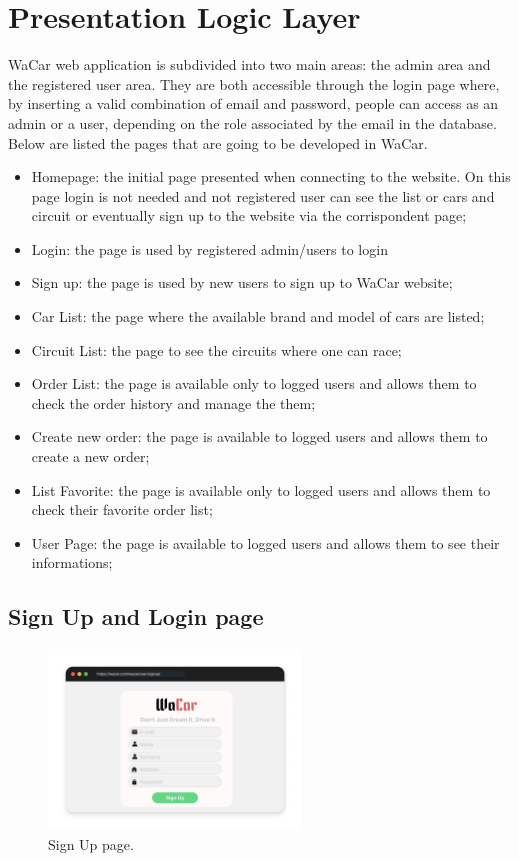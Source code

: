 \section{Presentation Logic Layer}


WaCar web application is subdivided into two main areas: the admin area and the registered user area. They are both accessible through the login page where, by inserting a valid combination of email and password, people can access as an admin or a user, depending on the role associated by the email in the database. Below are listed the pages that are going to be developed in WaCar.
\begin{itemize}
    \item Homepage: the initial page presented when connecting to the website. On this page login is not needed and not registered user can see the list or cars and circuit or eventually sign up to the website via the corrispondent page;
    \item Login: the page is used by registered admin/users to login
    \item Sign up: the page is used by new users to sign up to WaCar website;
    \item Car List: the page where the available brand and model of cars are listed;
    \item Circuit List: the page to see the circuits where one can race;
    \item Order List: the page is available only to logged users and allows them to check the order history and manage the them;
    \item Create new order: the page is available to logged users and allows them to create a new order;
    \item List Favorite: the page is available only to logged users and allows them to check their favorite order list;
    \item User Page: the page is available to logged users and allows them to see their informations;
\end{itemize}

\subsection{Sign Up and Login page}

\begin{figure}[h]
  \centering
    \includegraphics[width=0.6\textwidth]{mockup/SignUp.png}
    \caption{Sign Up page.}
    \label{fig:signup}
\end{figure}


